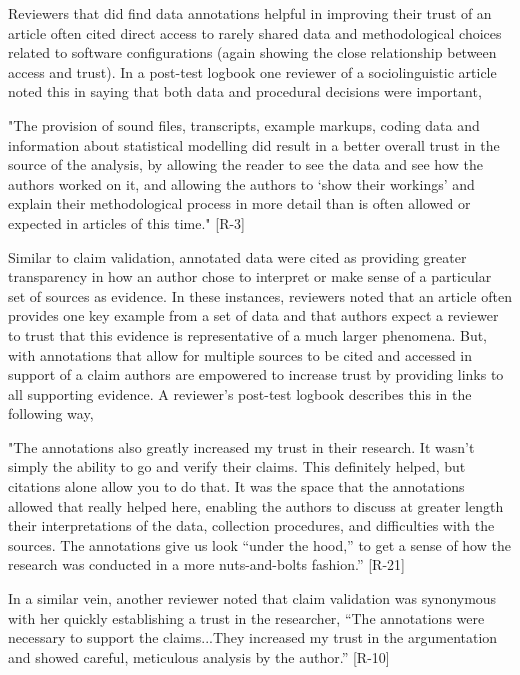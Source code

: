\documentclass[sigchi]{acmart}
\begin{document}
Reviewers that did find data annotations helpful in improving their trust of an article often cited direct access to rarely shared data and methodological choices related to software configurations (again showing the close relationship between access and trust). In a post-test logbook one reviewer of a sociolinguistic article noted this in saying that both data and procedural decisions were important, 
\begin{displayquote}
"The provision of sound files, transcripts, example markups, coding data and information about statistical modelling did result in a better overall trust in the source of the analysis, by allowing the reader to see the data and see how the authors worked on it, and allowing the authors to ‘show their workings’ and explain their methodological process in more detail than is often allowed or expected in articles of this time." [R-3] 
\end{displayquote}
Similar to claim validation, annotated data were cited as providing greater transparency in how an author chose to interpret or make sense of a particular set of sources as evidence. In these instances, reviewers noted that an article often provides one key example from a set of data and that authors expect a reviewer to trust that this evidence is representative of a much larger phenomena. But, with annotations that allow for multiple sources to be cited and accessed in support of a claim authors are empowered to increase trust by providing links to all supporting evidence. A reviewer’s post-test logbook describes this in the following way, 
\begin{displayquote}
"The annotations also greatly increased my trust in their research. It wasn't simply the ability to go and verify their claims. This definitely helped, but citations alone allow you to do that. It was the space that the annotations allowed that really helped here, enabling the authors to discuss at greater length their interpretations of the data, collection procedures, and difficulties with the sources. The annotations give us look “under the hood,” to get a sense of how the research was conducted in a more nuts-and-bolts fashion.” [R-21] 
\end{displayquote}

In a similar vein, another reviewer noted that claim validation was synonymous with her quickly establishing a trust in the researcher, “The annotations were necessary to support the claims...They increased my trust in the argumentation and showed careful, meticulous analysis by the author.” [R-10]
\end{document}
